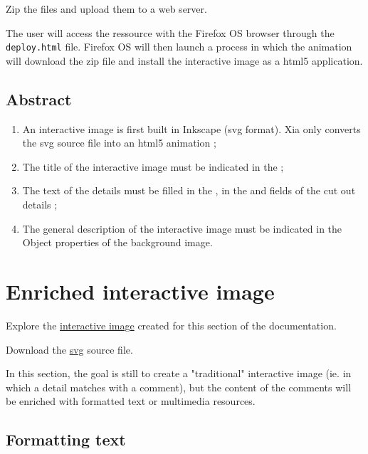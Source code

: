  
Zip the files and upload them to a web server.

The user will access the ressource with the Firefox OS browser through the \texttt{deploy.html} file. 
Firefox OS will then launch a process in which the animation will download the zip file and install the 
interactive image as a html5 application.

\subsection{Abstract}

\begin{enumerate}
 \item An interactive image is first built in Inkscape (svg format). Xia only 
 converts the svg source file into an html5 animation ;
 \item The title of the interactive image must be indicated in the  ;
 \item The text of the details must be filled in the , 
 in the  and  fields of the cut out details ;
 \item The general description of the interactive image must be indicated in the \softmenu
{Object properties} of the background image.
\end{enumerate}

\section{Enriched interactive image}\label{enriched_IA}

\begin{links}
Explore the \href{http://xia.dane.ac-versailles.fr/demo/tuto/xia2}{interactive image} created for this section of the documentation.

Download the \href{http://xia.dane.ac-versailles.fr/demo/tuto/xia2/svg/xia2.svg}{svg} source file.
\end{links}

In this section, the goal is still to create a "traditional" interactive image 
(ie. in which a detail matches with a comment), but the content of the comments 
will be enriched with  formatted text or multimedia resources.


\newpage
\subsection{Formatting text}

